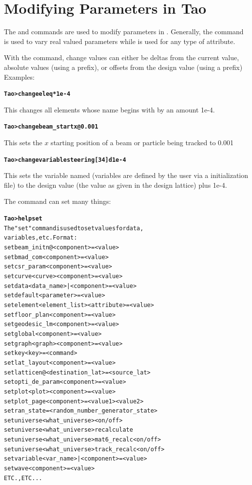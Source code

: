 \documentclass{hitec}
\newcommand{\BF}[1]{{\normalfont\textbf{#1}}}
\newenvironment{display}
  {\vspace*{-1.5ex} \begin{alltt}}
  {\end{alltt} \vspace*{-1.0ex}}
\begin{document}
\section{Modifying Parameters in Tao}

The  and  commands are used to modify parameters in \tao.  Generally,
the  command is used to vary real valued parameters while  is used
for any type of attribute.

With the  command, change values can either be deltas from the current value,
absolute values (using a  prefix), or offsets from the design value (using a 
prefix) Examples:
\begin{display}
  \BF{Tao> change ele q* 1e-4}
\end{display}
This changes all elements whose name begins with  by an amount 1e-4.
\begin{display}
  \BF{Tao> change beam_start x @0.001}
\end{display}
This sets the $x$ starting position of a beam or particle being tracked to 0.001
\begin{display}
  \BF{Tao> change variable steering[34] d 1e-4}
\end{display}
This sets the variable named  (variables are defined by the user via a
\tao initialization file) to the design value (the value as given in the design lattice)
plus 1e-4.

The  command can set many things:
\begin{display}
  \BF{Tao> help set}
  The "set" command is used to set values for data,
  variables, etc. Format:
    set beam_init {n@}<component> = <value>             
    set bmad_com <component> = <value>                  
    set csr_param <component> = <value>                 
    set curve <curve> <component> = <value>             
    set data <data_name>|<component> = <value>          
    set default <parameter> = <value>                   
    set element <element_list> <attribute> = <value>    
    set floor_plan <component> = <value>                
    set geodesic_lm <component> = <value>               
    set global <component> = <value>                    
    set graph <graph> <component> = <value>             
    set key <key> = <command>                           
    set lat_layout <component> = <value>                
    set lattice {n@}<destination_lat> = <source_lat>    
    set opti_de_param <component> = <value>             
    set plot <plot> <component> = <value>               
    set plot_page <component> = <value1> {<value2>}     
    set ran_state = <random_number_generator_state>     
    set universe <what_universe> <on/off>               
    set universe <what_universe> recalculate            
    set universe <what_universe> mat6_recalc <on/off>   
    set universe <what_universe> track_recalc <on/off>  
    set variable <var_name>|<component> = <value>       
    set wave <component> = <value>                      
  ETC., ETC...
\end{display}
\end{document}

